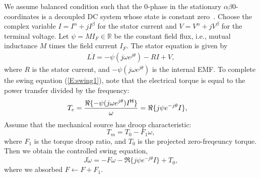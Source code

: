 We assume balanced condition such that the $0$-phase in the stationary $\alpha\beta0$-coordinates is a decoupled DC system whose state is constant zero~\cite{o2019geometric}.
Choose the complex variable $I = I^\alpha + j I^\beta$ for the stator current and $V = V^\alpha + j V^\beta$ for the terminal voltage. Let $\psi = M I_F \in \mathbb{R}$ be the constant field flux, i.e., mutual inductance $M$ times the field current $I_F$. The stator equation is given by
\begin{align*}
    L \dot{I} = -\psi (j\omega e^{j\theta}) - R I + V,
\end{align*}
where $R$ is the stator current, and $-\psi (j\omega e^{j\theta})$ is the internal EMF. %
To complete the swing equation (\ref{E:swing1}), note that the electrical torque is equal to the power transfer divided by the frequency:
\begin{align*}
    T_e &= \frac{\Re\{-\psi (j \omega e^{j\theta}) I^{\mathsf{H}} \}}{\omega} = \Re\{ j \psi e^{-j\theta} I\},
\end{align*}
Assume that the mechanical source has droop characteristic:
\begin{equation*}
    T_m = T_0 - F_1 \omega,
\end{equation*}
where $F_1$ is the torque droop ratio, and $T_0$ is the projected zero-freqeuncy torque.
Then we obtain the controlled swing equation,
\begin{equation*}
    J \dot\omega = -F \omega - \Re\{j\psi e^{-j\theta} I\} + T_0,
\end{equation*}
where we absorbed $F \leftarrow F + F_1$.


